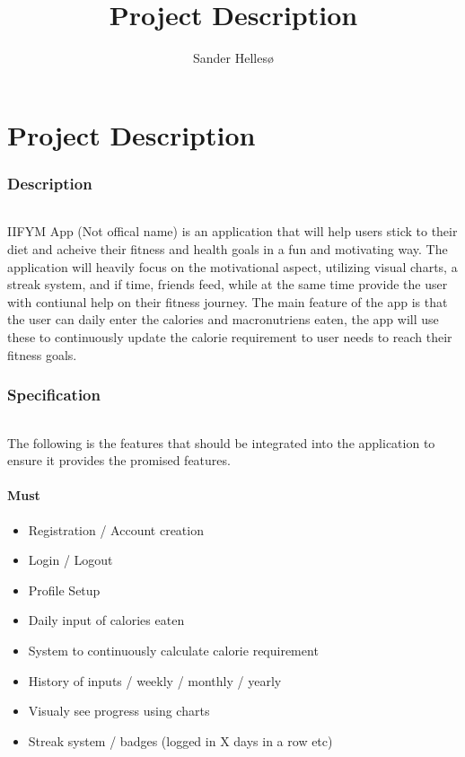 \documentclass{article}
\title{Project Description}
\author{Sander Hellesø}
\begin{document}

\setcounter{page}{1}

\part{Project Description}

  
\section{Description}
  \paragraph{}
  IIFYM App (Not offical name) is an application that will help users stick to their diet and acheive their fitness and health goals in a fun and motivating way.
  The application will heavily focus on the motivational aspect, utilizing visual charts, a streak system, and if time, friends feed, while
  at the same time provide the user with contiunal help on their fitness journey. The main feature of the app is that the user can daily enter 
  the calories and macronutriens eaten, the app will use these to continuously update the calorie requirement to user needs to reach their
  fitness goals.
  
  \hfill \break

\section{Specification}
  \paragraph{}
  The following is the features that should be integrated into the application to ensure it provides the promised features.

    \subsection{Must}
      \begin{itemize}
        \item Registration / Account creation
        \item Login / Logout
        \item Profile Setup
        \item Daily input of calories eaten
        \item System to continuously calculate calorie requirement
        \item History of inputs / weekly / monthly / yearly
        \item Visualy see progress using charts
        \item Streak system / badges (logged in X days in a row etc)
      \end{itemize}
\end{document}
